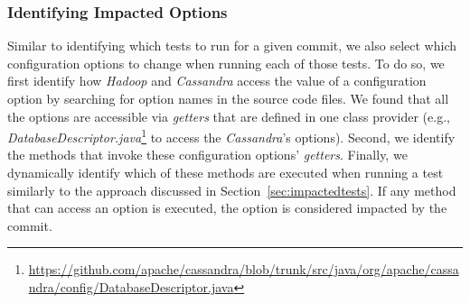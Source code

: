 

\subsubsection{Identifying Impacted Options}%
Similar to identifying which tests to run for a given commit, we also select which configuration options to change when running each of those tests. To do so, we first identify how \emph{Hadoop} and \emph{Cassandra} access the value of a configuration option by searching for option names in the source code files. We found that all the options are accessible via \emph{getters} that are defined in one class provider (e.g., \emph{DatabaseDescriptor.java}\footnote{\url{https://github.com/apache/cassandra/blob/trunk/src/java/org/apache/cassandra/config/DatabaseDescriptor.java}} to access the \emph{Cassandra}'s options). Second, we identify the methods that invoke these configuration options' \emph{getters}. Finally, we dynamically identify which of these methods are executed when running a test similarly to the approach discussed in Section~\ref{sec:impactedtests}. If any method that can access an option is executed, the option is considered impacted by the commit.

